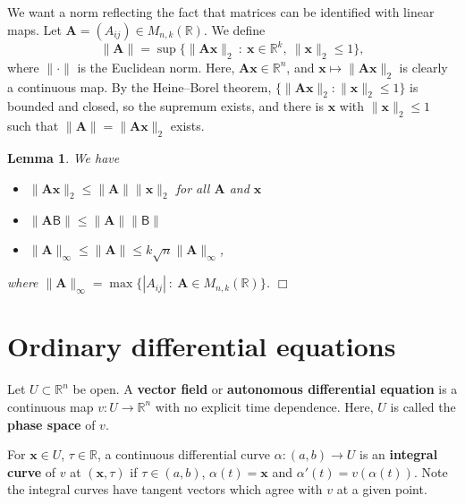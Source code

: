 \documentclass[letter-paper]{tufte-book}
\newtheorem{lemma}[theorem]{\color{pastel-blue}Lemma}
\newcommand{\qedwhite}{\hfill \ensuremath{\Box}}
\begin{document}
We want a norm reflecting the fact that matrices can be identified with linear
maps. Let $\boldsymbol{A} = (A_{ij}) \in M_{n,k}(\mathbb{R})$. We define
\begin{equation}
  \| \boldsymbol{A} \| = \sup \{ \|\boldsymbol{A}\boldsymbol{x}\|_2 \ : \ \boldsymbol{x} \in \mathbb{R}^k,\ \|\boldsymbol{x}\|_2 \leq 1\},
\end{equation}
where $\|\cdot\|$ is the Euclidean norm. Here, $\boldsymbol{A}\boldsymbol{x} \in
\mathbb{R}^n$, and $\boldsymbol{x} \mapsto \|\boldsymbol{A}\boldsymbol{x}\|_2$
is clearly a continuous map. By the Heine--Borel theorem, $\{
\|\boldsymbol{A}\boldsymbol{x}\|_2 : \|\boldsymbol{x}\|_2 \leq 1\}$ is bounded
and closed, so the supremum exists, and there is $\boldsymbol{x}$ with
$\|\boldsymbol{x}\|_2 \leq 1$ such that $\| \boldsymbol{A} \| =
\|\boldsymbol{A}\boldsymbol{x}\|_2$ exists.

\begin{lemma}
  We have
  \begin{itemize}
    \item $\|\boldsymbol{A}\boldsymbol{x}\|_2 \leq \|\boldsymbol{A}\|
    \|\boldsymbol{x}\|_2$ for all $\boldsymbol{A}$ and $\boldsymbol{x}$

    \item $\|\boldsymbol{A}\boldsymbol{\mathsf{B}}\| \leq \|\boldsymbol{A}\|
    \|\boldsymbol{\mathsf{B}}\|$
    
    \item $\|\boldsymbol{A}\|_\infty \leq \|\boldsymbol{A}\| \leq k\sqrt{n}
    \|\boldsymbol{A}\|_\infty$,
  \end{itemize}
  where $\|\boldsymbol{A}\|_\infty = \max \{ |A_{ij}|\ : \ \boldsymbol{A} \in
  M_{n,k}(\mathbb{R})\}$. \qedwhite
\end{lemma}


\chapter{Ordinary differential equations}

Let $U \subset \mathbb{R}^n$ be open. A \textbf{vector field} or
\textbf{autonomous differential equation} is a continuous map $v : U \to
\mathbb{R}^n$ with no explicit time dependence. Here, $U$ is called the
\textbf{phase space} of $v$.

For $\boldsymbol{x} \in U$, $\tau \in \mathbb{R}$, a continuous differential
curve $\alpha : (a,b) \to U$ is an \textbf{integral curve} of $v$ at
$(\boldsymbol{x}, \tau)$ if $\tau \in (a,b)$, $\alpha(t) = \boldsymbol{x}$ and
$\alpha'(t) = v(\alpha(t))$. Note the integral curves have tangent vectors which
agree with $v$ at a given point.
\end{document}
